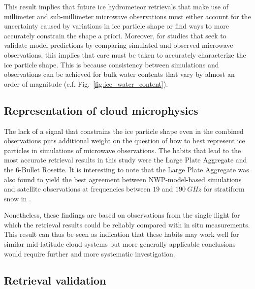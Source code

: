 \documentclass[journal abbreviation, manuscript]{copernicus}
\begin{document}
This result implies that future ice hydrometeor retrievals that make use of
millimeter and sub-millimeter microwave observations must either account for the
uncertainty caused by variations in ice particle shape or find ways to more
accurately constrain the shape a priori. Moreover, for studies that seek to
validate model predictions by comparing simulated and observed microwave
observations, this implies that care must be taken to accurately characterize
the ice particle shape. This is because consistency between simulations and
observations can be achieved for bulk water contents that vary by almost an order of
magnitude (c.f. Fig.~\ref{fig:ice_water_content}).

\subsection{Representation of cloud microphysics}

The lack of a signal that constrains the ice particle shape even in the combined
observations puts additional weight on the question of how to best represent ice
particles in simulations of microwave observations. The habits that lead to the
most accurate retrieval results in this study were the Large Plate Aggregate and
the 6-Bullet Rosette. It is interesting to note that the Large Plate Aggregate
was also found to yield the best agreement between NWP-model-based simulations
and satellite observations at frequencies between $19$ and $190\ \unit{GHz}$ for
stratiform snow in \citet{geer21}.

Nonetheless, these findings are based on observations from the single flight for
which the retrieval results could be reliably compared with in situ
measurements. This result can thus be seen as indication that these habits may
work well for similar mid-latitude cloud systems but more generally applicable
conclusions would require further and more systematic investigation.

\subsection{Retrieval validation}
\end{document}
